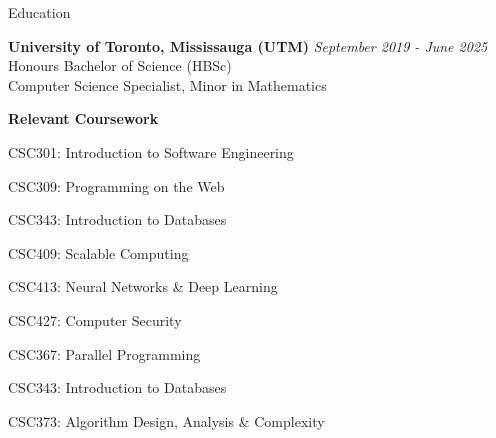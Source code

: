 \documentclass[11pt]{resume} %
\begin{document}



\begin{rSection}{Education}

	\textbf{University of Toronto, Mississauga (UTM)} \hfill \textit{September 2019 - June 2025} \\
	Honours Bachelor of Science (HBSc) \\
	Computer Science Specialist, Minor in Mathematics \\
	\begin{rSubsection}{\textbf{Relevant Coursework}}{}{}{}
		\item CSC301: Introduction to Software Engineering
		\item CSC309: Programming on the Web
		\item CSC343: Introduction to Databases
		\item CSC409: Scalable Computing
		\item CSC413: Neural Networks \& Deep Learning
		\item CSC427: Computer Security
		\item CSC367: Parallel Programming
		\item CSC343: Introduction to Databases
		\item CSC373: Algorithm Design, Analysis \& Complexity
	\end{rSubsection}
\end{rSection}

\end{document}
